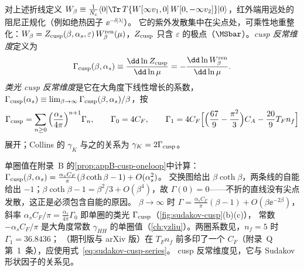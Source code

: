 \begin{definition}\label{def:sudakov-cusp}
对上述折线定义 $W_\beta\equiv\frac1{N_c}\langle0|\Tr\,T\{W[\infty v_1,0]\,W[0,-\infty v_2]\}|0\rangle$，红外端用远处的阻尼正规化（例如绝热因子 $\ee^{-\delta|\lambda|}$）。
它的紫外发散集中在尖点处，可乘性地重整化：$W_\beta=Z_{\rm cusp}(\beta,\alpha_s,\varepsilon)\,W_\beta^{\rm ren}(\mu)$，$Z_{\rm cusp}$ 只含 $\varepsilon$ 的极点（$\MSbar$）。\emph{cusp 反常维度}定义为
\begin{equation}\label{eq:sudakov-cusp-def}
\Gamma_{\rm cusp}(\beta,\alpha_s)\equiv\frac{\dd\ln Z_{\rm cusp}}{\dd\ln\mu}=-\frac{\dd\ln W_\beta^{\rm ren}}{\dd\ln\mu} .
\end{equation}
\emph{类光 cusp 反常维度}是它在大角度下线性增长的系数，$\Gamma_{\rm cusp}(\alpha_s)\equiv\lim_{\beta\to\infty}\Gamma_{\rm cusp}(\beta,\alpha_s)/\beta$，按
\begin{equation}\label{eq:sudakov-cusp-series}
\Gamma_{\rm cusp}=\sum_{n\ge0}\Big(\frac{\alpha_s}{4\pi}\Big)^{n+1}\Gamma_n,\qquad \Gamma_0=4C_F,\qquad
\Gamma_1=4C_F\Big[\Big(\frac{67}9-\frac{\pi^2}3\Big)C_A-\frac{20}9T_Fn_f\Big]
\end{equation}
展开；Collins 的 $\gamma_K$ 与之的关系为 $\gamma_K=2\Gamma_{\rm cusp}$。
\end{definition}

单圈值在附录~B 的\cref{prop:appB-cusp-oneloop}中计算：$\Gamma_{\rm cusp}(\beta,\alpha_s)=\frac{\alpha_sC_F}{\pi}(\beta\coth\beta-1)+O(\alpha_s^2)$。%
交换图给出 $\beta\coth\beta$，两条线的自能给出 $-1$；$\beta\coth\beta-1=\beta^2/3+O(\beta^4)$，故 $\Gamma(0)=0$——不折的直线没有尖点发散，这正是必须包含自能的原因。
$\beta\to\infty$ 时 $\Gamma=\frac{\alpha_sC_F}\pi(\beta-1)+O(\beta\ee^{-2\beta})$，斜率 $\alpha_sC_F/\pi=\frac{\alpha_s}{4\pi}\Gamma_0$ 即单圈的类光 $\Gamma_{\rm cusp}$（\cref{fig:sudakov-cusp}(b)(c)），
常数 $-\alpha_sC_F/\pi$ 是大角度常数 $\gamma_{HH}$ 的单圈值（\cref{ch:yzliu}）。两圈系数见\cite{KorchemskyRadyushkin1987}，$n_f=5$ 时 $\Gamma_1=36.8436$；
\cite[式~(A.10)]{BecherSchwartz2008}（期刊版与 arXiv 版）在 $T_Fn_f$ 前多印了一个 $C_F$（附录~Q 第~1~条），应使用式~\eqref{eq:sudakov-cusp-series}。
cusp 反常维度见\cite{Polyakov1980,BrandtNeriSato1981,KorchemskyRadyushkin1987}，它与 Sudakov 形状因子的关系见\cite{Korchemsky1989}。


